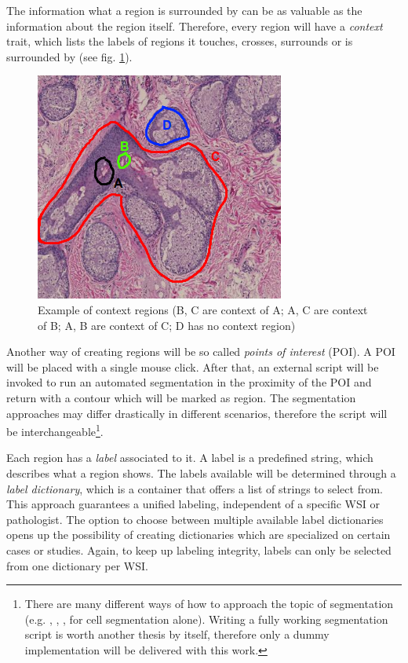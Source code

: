 The information what a region is surrounded by can be as valuable as the information about the region itself\cite{Bankman00}. Therefore, every region will have a \emph{context} trait, which lists the labels of regions it touches, crosses, surrounds or is surrounded by (see fig. \ref{fig4_contextregions}).

\begin{figure}[H]
	\begin{center}
		\includegraphics[scale=0.5]{img/contextregions.png}
		\caption{Example of context regions (B, C are context of A; A, C are context of B; A, B are context of C; D has no context region)}
		\label{fig4_contextregions}
	\end{center}
\end{figure}

Another way of creating regions will be so called \emph{points of interest} (POI). A POI will be placed with a single mouse click. After that, an external script will be invoked to run an automated segmentation in the proximity of the POI and return with a contour which will be marked as region. The segmentation approaches may differ drastically in different scenarios\cite{Liu12}, therefore the script will be interchangeable\footnote{There are many different ways of how to approach the topic of segmentation (e.g. \cite{Qi12}, \cite{Sharma16}, \cite{Wienert12}, \cite{Angulo10} for cell segmentation alone). Writing a fully working segmentation script is worth another thesis by itself, therefore only a dummy implementation will be delivered with this work.}.

Each region has a \emph{label} associated to it. A label is a predefined string, which describes what a region shows. The labels available will be determined through a \emph{label dictionary}, which is a container that offers a list of strings to select from. This approach guarantees a unified labeling, independent of a specific WSI or pathologist. The option to choose between multiple available label dictionaries opens up the possibility of creating dictionaries which are specialized on certain cases or studies. Again, to keep up labeling integrity, labels can only be selected from one dictionary per WSI.

